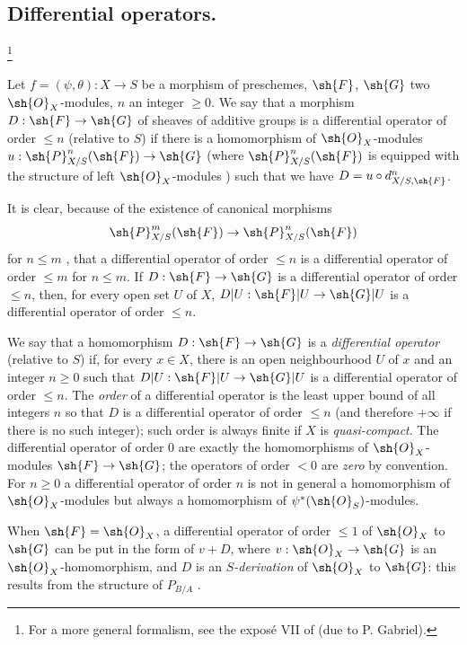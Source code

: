\subsection{Differential operators.}
\footnote{
  For a more general formalism, see the expos\'e VII of \cite{IV-42} (due to P. Gabriel).
}
\label{IV.16.8}

\begin{definition}[16.8.1]
\label{IV.16.8.1}
Let $f = (\psi, \theta): X \to S$ be a morphism of preschemes, $\sh{F}$, $\sh{G}$ two $\sh{O}_X$-modules, $n$ an integer $\geq 0$.
We say that a morphism $D: \sh{F} \to \sh{G}$ of sheaves of additive groups is a differential operator of order $\leq n$ (relative to $S$) if there is a homomorphism of $\sh{O}_X$-modules $u: \sh{P}_{X/S}^n(\sh{F}) \to \sh{G}$ (where $\sh{P}_{X/S}^n(\sh{F})$ is equipped with the structure of left $\sh{O}_X$-modules ) such that we have $D = u \circ d_{X/S, \sh{F}}^n$.
\end{definition}

It is clear, because of the existence of canonical morphisms
\[
  \sh{P}_{X/S}^m(\sh{F}) \to \sh{P}_{X/S}^n(\sh{F})
\] 
for $n \leq m$ , that a differential operator of order $\leq n$ is a differential operator of order $\leq m$ for $n \leq m$.
If $D:\sh{F} \to \sh{G}$ is a differential operator of order $\leq n$, then, for every open set $U$ of $X$, $D|U: \sh{F}|U \to \sh{G}|U$ is a differential operator of order $\leq n$.

We say that a homomorphism $D: \sh{F} \to \sh{G}$ is a \emph{differential operator} (relative to $S$) if, for every $x \in X$, there is an open neighbourhood $U$ of $x$ and an integer $n \geq 0$ such that $D|U: \sh{F}|U \to \sh{G}|U$ is a differential operator of order $\leq n$.
The \emph{order} of a differential operator is the least upper bound of all integers $n$ so that $D$ is a differential operator of order $\leq n$ (and therefore $+\infty$ if there is no such integer);
such order is always finite if $X$ is \emph{quasi-compact}.
The differential operator of order $0$ are exactly the homomorphisms of $\sh{O}_X$-modules $\sh{F} \to \sh{G}$;
the operators of order $<0$ are \emph{zero} by convention.
For $n \geq 0$ a differential operator of order $n$ is not in general a homomorphism of $\sh{O}_X$-modules but always a homomorphism of $\psi^*(\sh{O}_S)$-modules.

When $\sh{F} = \sh{O}_X$, a differential operator of order $\leq 1$ of $\sh{O}_X$ to $\sh{G}$ can be put in the form of $v + D$, where $v: \sh{O}_X \to \sh{G}$ is an $\sh{O}_X$-homomorphism, and $D$ is an \emph{$S$-derivation}  of $\sh{O}_X$ to $\sh{G}$: this results from the structure of $P_{B/A}$ .

